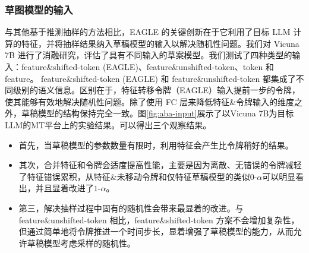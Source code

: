 \documentclass{article}
\theoremstyle{plain}
\theoremstyle{definition}
\theoremstyle{remark}
\begin{document}
\begin{table}[t]
  \centering
  \caption{使用和不使用树注意力的 EAGLE 的平均接受长度 $\tau$。评估数据集为MT-bench，温度参数设置为0。}
  \label{tab:aba-chain}%
\end{table}%



\subsubsection{草图模型的输入}
\label{sec:input}
与其他基于推测抽样的方法相比，EAGLE 的关键创新在于它利用了目标 LLM 计算的特征，并将抽样结果纳入草稿模型的输入以解决随机性问题。我们对 Vicuna 7B 进行了消融研究，评估了具有不同输入的草案模型。我们测试了四种类型的输入：feature\&shifted-token (EAGLE)、feature\&unshifted-token、token 和 feature。 feature\&shifted-token (EAGLE) 和 feature\&unshifted-token 都集成了不同级别的语义信息。区别在于，特征转移令牌（EAGLE）输入提前一步的令牌，使其能够有效地解决随机性问题。除了使用 FC 层来降低特征\&令牌输入的维度之外，草稿模型的结构保持完全一致。图\ref{fig:aba-input}展示了以Vicuna 7B为目标LLM的MT平台上的实验结果。可以得出三个观察结果。
\begin{itemize}
 \item 首先，当草稿模型的参数数量有限时，利用特征会产生比令牌稍好的结果。
 \item 其次，合并特征和令牌会适度提高性能，主要是因为离散、无错误的令牌减轻了特征错误累积，从特征\&未移动令牌和仅特征草稿模型的类似$0\text{-}\alpha$可以明显看出，并且显着改进了$1\text{-}\alpha$。
 \item 第三，解决抽样过程中固有的随机性会带来最显着的改进。与 feature\&unshifted-token 相比，feature\&shifted-token 方案不会增加复杂性，但通过简单地将令牌推进一个时间步长，显着增强了草稿模型的能力，从而允许草稿模型考虑采样的随机性。
\end{itemize}
\end{document}
